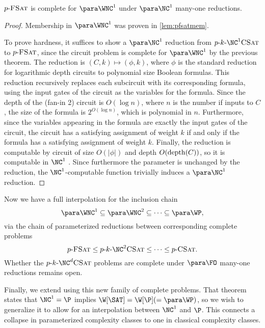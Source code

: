 \begin{theorem}\label{thm:pfsatcomplete}
  $p \textnormal{-} \textsc{FSat}$ is complete for $\para \WNC^1$ under $\para \NC^1$ many-one reductions.
\end{theorem}
\begin{proof}
  Membership in $\para \WNC^1$ was proven in \autoref{lem:pfsatmem}.

  To prove hardness, it suffices to show a $\para \NC^1$ reduction from $p \dash k \dash \NC^1 \textsc{CSat}$ to $p \textnormal{-} \textsc{FSat}$, since the circuit problem is complete for $\para \WNC^1$ by the previous theorem.
  The reduction is $(C, k) \mapsto (\phi, k)$, where $\phi$ is the standard reduction for logarithmic depth circuits to polynomial size Boolean formulas.
  This reduction recursively replaces each subcircuit with its corresponding formula, using the input gates of the circuit as the variables for the formula.
  Since the depth of the (fan-in 2) circuit is $O(\log n)$, where $n$ is the number if inputs to $C$, the size of the formula is $2^{O(\log n)}$, which is polynomial in $n$.
  Furthermore, since the variables appearing in the formula are exactly the input gates of the circuit, the circuit has a satisfying assignment of weight $k$ if and only if the formula has a satisfying assignment of weight $k$.
  Finally, the reduction is computable by circuit of size $O(|\phi|)$ and depth $O(\operatorname{depth}(C))$, so it is computable in $\NC^1$ .
  Since furthermore the parameter is unchanged by the reduction, the $\NC^1$-computable function trivially induces a $\para \NC^1$ reduction.
\end{proof}

Now we have a full interpolation for the inclusion chain
\[
\para \WNC^1 \subseteq \para \WNC^2 \subseteq \dotsb \subseteq \para \WP,
\]
via the chain of parameterized reductions between corresponding complete problems
\[
\pFSAT \leq p \dash k \dash \NC^2 \textsc{CSat} \leq \dotsb \leq p \dash \textsc{CSat}.
\]
Whether the $\pNCSAT$ problems are complete under $\para \FO$ many-one reductions remains open.

Finally, we extend \autocite[Corollary~3.7]{est15} using this new family of complete problems.
That theorem states that $\NC^1 = \P$ implies $\W[\SAT] = \W[\P] (= \para \WP)$, so we wish to generalize it to allow for an interpolation between $\NC^1$ and $\P$.
This connects a collapse in parameterized complexity classes to one in classical complexity classes.

